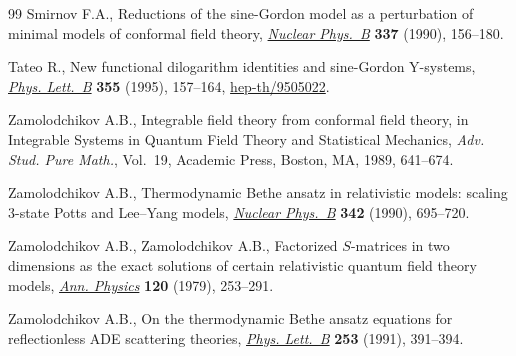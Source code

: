 \documentclass[pdftex]{sigma}
\numberwithin{equation}{section}
\theoremstyle{definition}
\begin{document}
\begin{thebibliography}{99}
Smirnov F.A.,
Reductions of the sine-Gordon model as a perturbation of minimal models of conformal f\/ield theory,
\href{http://dx.doi.org/10.1016/0550-3213(90)90255-C}{{\em Nuclear Phys.~B}} {\bf 337} (1990), 156--180.

Tateo R.,
New functional dilogarithm identities and sine-Gordon Y-systems,
\href{http://dx.doi.org/10.1016/0370-2693(95)00751-6}{{\em Phys. Lett.~B}} {\bf 355} (1995), 157--164,
\href{http://arxiv.org/abs/hep-th/9505022}{hep-th/9505022}.

Zamolodchikov A.B.,
Integrable f\/ield theory from conformal f\/ield theory,
in Integrable Systems in Quantum Field Theory and Statistical Mechanics,
{\it Adv. Stud. Pure Math.}, Vol.~19, Academic Press, Boston, MA, 1989, 641--674.

Zamolodchikov A.B.,
Thermodynamic Bethe ansatz in relativistic models: scaling 3-state Potts and Lee--Yang models,
\href{http://dx.doi.org/10.1016/0550-3213(90)90333-9}{{\em Nuclear Phys.~B}} {\bf 342} (1990), 695--720.

Zamolodchikov A.B., Zamolodchikov A.B.,
Factorized $S$-matrices in two dimensions as the exact solutions of  certain relativistic quantum f\/ield theory models,
\href{http://dx.doi.org/10.1016/0003-4916(79)90391-9}{{\em Ann. Physics}} {\bf  120} (1979), 253--291.

Zamolodchikov A.B.,
On the thermodynamic Bethe ansatz equations for ref\/lectionless ADE scattering theo\-ries,
\href{http://dx.doi.org/10.1016/0370-2693(91)91737-G}{{\em Phys. Lett.~B}} {\bf 253} (1991), 391--394.

\end{thebibliography}\LastPageEnding
\end{document}
